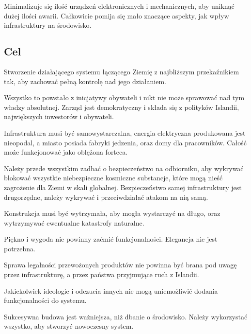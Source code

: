 Minimalizuje się ilość urządzeń elektronicznych i mechanicznych, aby uniknąć dużej ilości awarii.
Całkowicie pomija się mało znaczące aspekty, jak wpływ infrastruktury na środowisko.

\subsection{Cel}
Stworzenie działającego systemu łączącego Ziemię z najbliższym przekaźnikiem tak, aby zachować pełną kontrolę nad jego działaniem.

Wszystko to powstało z inicjatywy obywateli i nikt nie może sprawować nad tym władzy absolutnej. Zarząd jest demokratyczny i składa się z polityków Islandii, największych inwestorów i obywateli.

Infrastruktura musi być samowystarczalna, energia elektryczna produkowana jest nieopodal, a miasto posiada fabryki jedzenia, oraz domy dla pracowników. Całość może funkcjonować jako oblężona forteca.

Należy przede wszystkim zadbać o bezpieczeństwo na odbiorniku, aby wykrywać blokować wszystkie niebezpieczne kosmiczne substancje, które mogą nieść zagrożenie dla Ziemi w skali globalnej.
Bezpieczeństwo samej infrastruktury jest drugorzędne, należy wykrywać i przeciwdziałać atakom na nią samą.

Konstrukcja musi być wytrzymała, aby mogła wystarczyć na długo, oraz wytrzymywać ewentualne katastrofy naturalne.

Piękno i wygoda nie powinny zaćmić funkcjonalności. Elegancja nie jest potrzebna.

Sprawa legalności przewożonych produktów nie powinna być brana pod uwagę przez infrastrukturę, a przez państwa przyjmujące ruch z Islandii.

Jakiekolwiek ideologie i odczucia innych nie mogą uniemożliwić dodania funkcjonalności do systemu. 

Sukcesywna budowa jest ważniejsza, niż dbanie o środowisko. Należy wykorzystać wszystko, aby stworzyć nowoczesny system.

